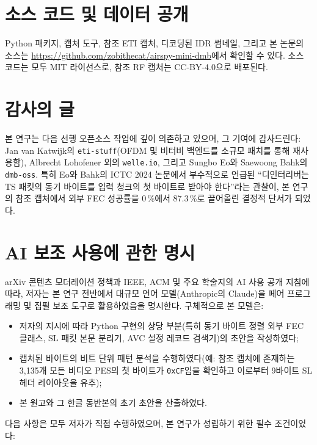 \documentclass[11pt,a4paper]{article}
\begin{document}
\section*{소스 코드 및 데이터 공개}
Python 패키지, 캡처 도구, 참조 ETI 캡처, 디코딩된 IDR 썸네일, 그리고 본
논문의 소스는 \url{https://github.com/zobithecat/airspy-mini-dmb}에서 확인할
수 있다.  소스 코드는 모두 MIT 라이선스로, 참조 RF 캡처는 CC-BY-4.0으로
배포된다.

\section*{감사의 글}
본 연구는 다음 선행 오픈소스 작업에 깊이 의존하고 있으며, 그 기여에
감사드린다: Jan van Katwijk의 \texttt{eti-stuff}(OFDM 및 비터비
백엔드를 소규모 패치를 통해 재사용함), Albrecht Lohofener 외의
\texttt{welle.io}, 그리고 Sungbo Eo와 Saewoong Bahk의
\texttt{dmb-oss}.  특히 Eo와 Bahk의 ICTC 2024 논문에서 부수적으로
언급된 ``디인터리버는 TS 패킷의 동기 바이트를 입력 청크의 첫
바이트로 받아야 한다''라는 관찰이, 본 연구의 참조 캡처에서 외부
FEC 성공률을 0\,\%에서 87.3\,\%로 끌어올린 결정적 단서가 되었다.

\section*{AI 보조 사용에 관한 명시}
arXiv 콘텐츠 모더레이션 정책과 IEEE, ACM 및 주요 학술지의 AI 사용
공개 지침에 따라, 저자는 본 연구 전반에서 대규모 언어 모델(Anthropic의
Claude)을 페어 프로그래밍 및 집필 보조 도구로 활용하였음을 명시한다.
구체적으로 본 모델은:

\begin{itemize}[leftmargin=*,nosep]
\item 저자의 지시에 따라 Python 구현의 상당 부분(특히 동기 바이트
       정렬 외부 FEC 클래스, SL 패킷 본문 분리기, AVC 설정 레코드
       검색기)의 초안을 작성하였다;
\item 캡처된 바이트의 비트 단위 패턴 분석을 수행하였다(예:
       참조 캡처에 존재하는 3{,}135개 모든 비디오 PES의 첫 바이트가
       \texttt{0xCF}임을 확인하고 이로부터 9바이트 SL 헤더 레이아웃을
       유추);
\item 본 원고와 그 한글 동반본의 초기 초안을 산출하였다.
\end{itemize}

다음 사항은 모두 저자가 직접 수행하였으며, 본 연구가 성립하기 위한
필수 조건이었다:
\end{document}
